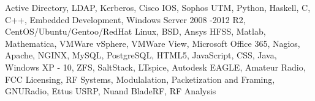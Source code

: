 
\begin{cventries}
    \begin{cvitems}
    \item {Active Directory, LDAP, Kerberos, Cisco IOS, Sophos UTM, Python, Haskell, C, C++, Embedded Development, Windows Server 2008 -2012 R2, CentOS/Ubuntu/Gentoo/RedHat Linux, BSD, Ansys HFSS, Matlab, Mathematica, VMWare vSphere, VMWare View, Microsoft Office 365, Nagios, Apache, NGINX, MySQL, PostgreSQL, HTML5, JavaScript, CSS, Java, Windows XP - 10, ZFS, SaltStack, LTspice, Autodesk EAGLE, Amateur Radio, FCC Licensing, RF Systems, Modulalation, Packetization and Framing, GNURadio, Ettus USRP, Nuand BladeRF, RF Analysis}
    \end{cvitems}
\end{cventries}
